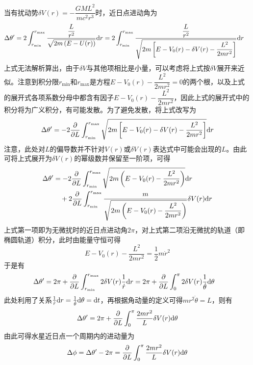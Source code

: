 \begin{solution}
当有扰动势$\delta V(r)=-\dfrac{GML^2}{mc^2r^3}$时，近日点进动角为
\begin{align*}
	\Delta \theta' & = 2\int_{r_{\min}}^{r_{\max}} \frac{\dfrac{L}{r^2}}{\sqrt{2m\left(E-U(r)\right)}} \mathrm{d} r = 2\int_{r_{\min}}^{r_{\max}} \frac{\dfrac{L}{r^2}}{\sqrt{2m\left[E-V_0(r)-\delta V(r)-\dfrac{L^2}{2mr^2}\right]}} \mathrm{d} r
\end{align*}
上式无法解析算出，由于$\delta V$与其他项相比是小量，可以考虑将上式按$\delta V$展开来近似。注意到积分限$r_{\min}$和$r_{\max}$是方程$E-V_0(r)-\dfrac{L^2}{2mr^2} = 0$的两个根，以及上式的展开式各项系数分母中都含有因子$E-V_0(r)-\dfrac{L^2}{2mr^2}$，因此上式的展开式中的积分将为广义积分，有可能发散。为了避免发散，将上式改写为
\begin{equation*}
	\Delta \theta' = -2\frac{\partial}{\partial L}\int_{r_{\min}}^{r_{\max}} \sqrt{2m\left[E-V_0(r)-\delta V(r)-\dfrac{L^2}{2mr^2}\right]} \mathrm{d} r
\end{equation*}
注意，此处对$L$的偏导数并不针对$V(r)$或$\delta V(r)$表达式中可能会出现的$L$。由此可将上式展开为$\delta V(r)$的幂级数并保留至一阶项，可得
\begin{align*}
	\Delta \theta' & = -2\frac{\partial}{\partial L} \int_{r_{\min}}^{r_{\max}} \sqrt{2m\left(E-V_0(r)-\dfrac{L^2}{2mr^2}\right)} \mathrm{d} r \\
	& \quad {} + 2\frac{\partial}{\partial L} \int_{r_{\min}}^{r_{\max}} \frac{m}{\sqrt{2m\left(E-V_0(r)-\dfrac{L^2}{2mr^2}\right)}} \delta V(r)\mathrm{d} r
\end{align*}
上式第一项即为无微扰时的近日点进动角$2\pi$，对上式第二项沿无微扰的轨道（即椭圆轨道）积分，此时由能量守恒可得
\begin{equation*}
	E-V_0(r)-\dfrac{L^2}{2mr^2} = \frac12 m\dot{r}^2
\end{equation*}
于是有
\begin{align*}
	\Delta \theta' & = 2\pi + \frac{\partial}{\partial L} \int_{r_{\min}}^{r_{\max}} 2\delta V(r) \frac{1}{\dot{r}} \mathrm{d} r = 2\pi + \frac{\partial}{\partial L} \int_0^\pi 2\delta V(r)\frac{1}{\dot{\theta}} \mathrm{d} \theta
\end{align*}
此处利用了关系$\frac{1}{\dot{r}} \mathrm{d} r = \frac{1}{\dot{\theta}} \mathrm{d} \theta = \mathrm{d} t$，再根据角动量的定义可得$mr^2\dot{\theta} = L$，则有
\begin{equation*}
	\Delta \theta' = 2\pi + \frac{\partial}{\partial L} \int_0^{\pi} \frac{2mr^2}{L} \delta V(r) \mathrm{d} \theta
\end{equation*}
由此可得水星近日点一个周期内的进动量为
\begin{equation*}
	\Delta \phi = \Delta\theta' - 2\pi = \frac{\pl}{\pl L} \int_0^{\pi} \frac{2mr^2}{L} \delta V(r) \mathd \theta

\end{equation*}
\end{solution}
